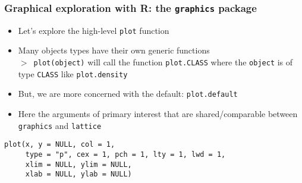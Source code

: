 \documentclass[11pt,pdftex,dvipsnames,usenames,helvetica]{beamer}
\begin{document}
\begin{frame}[fragile]
\frametitle{Graphical exploration with R: the {\tt graphics} package}

\begin{itemize}
\item Let's explore the high-level {\tt plot} function 
\item Many objects types have their own generic functions\\ {\tt $>$
    plot(object)} will call the function {\tt plot.CLASS} where the
  {\tt object} is of type {\tt CLASS} like {\tt plot.density}
\item But, we are more concerned with the default: {\tt plot.default}
\item Here the arguments of primary interest
that are shared/comparable between {\tt graphics} and {\tt lattice}
\end{itemize}
\begin{verbatim}
plot(x, y = NULL, col = 1, 
     type = "p", cex = 1, pch = 1, lty = 1, lwd = 1,
     xlim = NULL, ylim = NULL,
     xlab = NULL, ylab = NULL)
\end{verbatim}
\end{frame}
\end{document}
